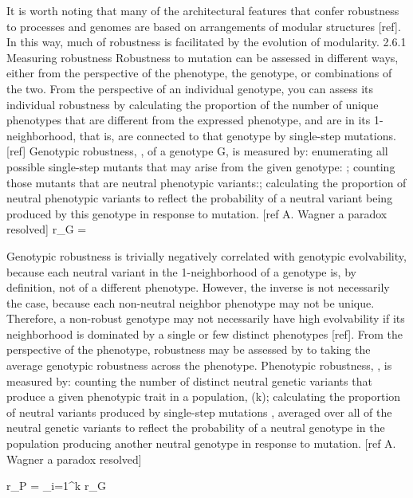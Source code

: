 It is worth noting that many of the architectural features that confer robustness to processes and genomes are based on arrangements of modular structures [ref]. In this way, much of robustness is facilitated by the evolution of modularity.
2.6.1 Measuring robustness
Robustness to mutation can be assessed in different ways, either from the perspective of the phenotype, the genotype, or combinations of the two.  From the perspective of an individual genotype, you can assess its individual robustness by calculating the proportion of the number of unique phenotypes that are different from the expressed phenotype, and are in its 1-neighborhood, that is, are connected to that genotype by single-step mutations. [ref]
Genotypic robustness, , of a genotype G, is measured by:
enumerating all possible single-step mutants that may arise from the given genotype: ;
counting those mutants that are neutral phenotypic variants:;
calculating the proportion of neutral phenotypic variants to reflect the probability of a neutral variant being produced by this genotype in response to mutation. [ref A. Wagner a paradox resolved]
r_{G} =  
 

Genotypic robustness is trivially negatively correlated with genotypic evolvability, because each neutral variant in the 1-neighborhood of a genotype is, by definition, not of a different phenotype. However, the inverse is not necessarily the case, because each non-neutral neighbor phenotype may not be unique. Therefore, a non-robust genotype may not necessarily have high evolvability if its neighborhood is dominated by a single or few distinct phenotypes [ref].
From the perspective of the phenotype, robustness may be assessed by to taking the average genotypic robustness across the phenotype.
Phenotypic robustness, , is measured by:
counting the number of distinct neutral genetic variants that produce a given phenotypic trait in a population, (k);
calculating the proportion of neutral variants produced by single-step mutations , averaged over all of the neutral genetic variants to reflect the probability of a neutral genotype in the population producing another neutral genotype in response to mutation. [ref A. Wagner a paradox resolved]

r_{P} =   \sum_{i=1}^{k} r_{G} 


